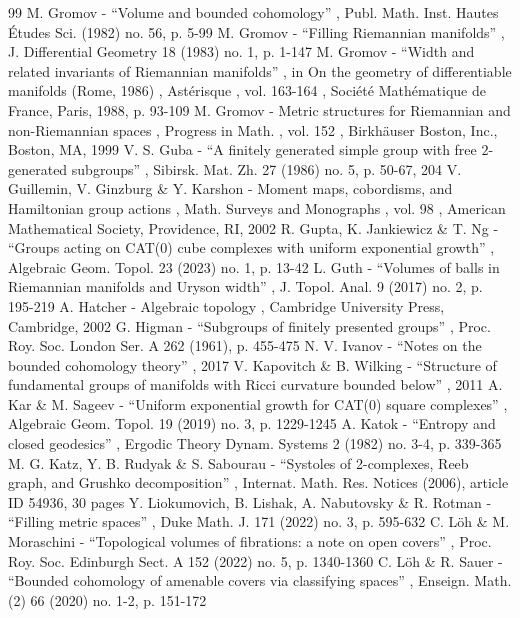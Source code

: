\begin{thebibliography}{99}
 M. Gromov - “Volume and bounded cohomology” , Publ. Math. Inst. Hautes Études Sci. (1982) no. 56, p. 5-99
 M. Gromov - “Filling Riemannian manifolds” , J. Differential Geometry 18 (1983) no. 1, p. 1-147
 M. Gromov - “Width and related invariants of Riemannian manifolds” , in On the geometry of differentiable manifolds (Rome, 1986) , Astérisque , vol. 163-164 , Société Mathématique de France, Paris, 1988, p. 93-109
 M. Gromov - Metric structures for Riemannian and non-Riemannian spaces , Progress in Math. , vol. 152 , Birkhäuser Boston, Inc., Boston, MA, 1999
 V. S. Guba - “A finitely generated simple group with free $2$-generated subgroups” , Sibirsk. Mat. Zh. 27 (1986) no. 5, p. 50-67, 204
 V. Guillemin, V. Ginzburg \& Y. Karshon - Moment maps, cobordisms, and Hamiltonian group actions , Math. Surveys and Monographs , vol. 98 , American Mathematical Society, Providence, RI, 2002
 R. Gupta, K. Jankiewicz \& T. Ng - “Groups acting on CAT(0) cube complexes with uniform exponential growth” , Algebraic Geom. Topol. 23 (2023) no. 1, p. 13-42
 L. Guth - “Volumes of balls in Riemannian manifolds and Uryson width” , J. Topol. Anal. 9 (2017) no. 2, p. 195-219
 A. Hatcher - Algebraic topology , Cambridge University Press, Cambridge, 2002
 G. Higman - “Subgroups of finitely presented groups” , Proc. Roy. Soc. London Ser. A 262 (1961), p. 455-475
 N. V. Ivanov - “Notes on the bounded cohomology theory” , 2017
 V. Kapovitch \& B. Wilking - “Structure of fundamental groups of manifolds with Ricci curvature bounded below” , 2011
 A. Kar \& M. Sageev - “Uniform exponential growth for CAT(0) square complexes” , Algebraic Geom. Topol. 19 (2019) no. 3, p. 1229-1245
 A. Katok - “Entropy and closed geodesics” , Ergodic Theory Dynam. Systems 2 (1982) no. 3-4, p. 339-365
 M. G. Katz, Y. B. Rudyak \& S. Sabourau - “Systoles of 2-complexes, Reeb graph, and Grushko decomposition” , Internat. Math. Res. Notices (2006), article ID 54936, 30 pages
 Y. Liokumovich, B. Lishak, A. Nabutovsky \& R. Rotman - “Filling metric spaces” , Duke Math. J. 171 (2022) no. 3, p. 595-632
 C. Löh \& M. Moraschini - “Topological volumes of fibrations: a note on open covers” , Proc. Roy. Soc. Edinburgh Sect. A 152 (2022) no. 5, p. 1340-1360
 C. Löh \& R. Sauer - “Bounded cohomology of amenable covers via classifying spaces” , Enseign. Math. (2) 66 (2020) no. 1-2, p. 151-172

\end{thebibliography}
